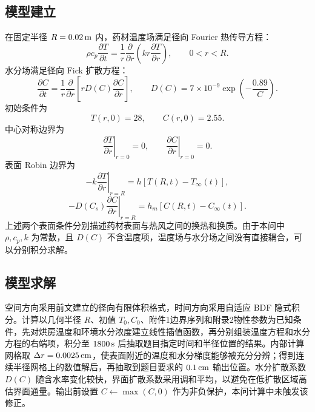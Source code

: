 \documentclass[UTF8,a4paper,12pt]{ctexart}
\numberwithin{equation}{section}
\begin{document}
\subsection{模型建立}
在固定半径 $R=0.02\rm\,m$ 内，药材温度场满足径向 Fourier 热传导方程：
\begin{equation}
  \rho c_p\frac{\partial T}{\partial t}
  =\frac1r\frac{\partial}{\partial r}
  \left(kr\frac{\partial T}{\partial r}\right),
  \qquad 0<r<R.
\end{equation}
水分场满足径向 Fick 扩散方程：
\begin{equation}
  \frac{\partial C}{\partial t}
  =\frac1r\frac{\partial}{\partial r}
  \left[rD(C)\frac{\partial C}{\partial r}\right],
  \qquad
  D(C)=7\times10^{-9}\exp\left(-\frac{0.89}{C}\right).
\end{equation}
初始条件为
\begin{equation}
  T(r,0)=28,\qquad C(r,0)=2.55.
\end{equation}
中心对称边界为
\begin{equation}
  \left.\frac{\partial T}{\partial r}\right|_{r=0}=0,\qquad
  \left.\frac{\partial C}{\partial r}\right|_{r=0}=0.
\end{equation}
表面 Robin 边界为
\begin{equation}
  -k\left.\frac{\partial T}{\partial r}\right|_{r=R}
  =h\left[T(R,t)-T_\infty(t)\right],
\end{equation}
\begin{equation}
  -D(C_s)\left.\frac{\partial C}{\partial r}\right|_{r=R}
  =h_m\left[C(R,t)-C_\infty(t)\right].
\end{equation}
上述两个表面条件分别描述药材表面与热风之间的换热和换质。由于本问中 $\rho,c_p,k$ 为常数，且 $D(C)$ 不含温度项，温度场与水分场之间没有直接耦合，可以分别积分求解。

\subsection{模型求解}
空间方向采用前文建立的径向有限体积格式，时间方向采用自适应 BDF 隐式积分。计算以几何半径 $R$、初值 $T_0,C_0$、附件1边界序列和附录2物性参数为已知条件，先对烘房温度和环境水分浓度建立线性插值函数，再分别组装温度方程和水分方程的右端项，积分至 $1800\rm\,s$ 后抽取题目指定时间和半径位置的结果。内部计算网格取 $\Delta r=0.0025\rm\,cm$，使表面附近的温度和水分梯度能够被充分分辨；得到连续半径网格上的数值解后，再抽取到题目要求的 $0.1\rm\,cm$ 输出位置。水分扩散系数 $D(C)$ 随含水率变化较快，界面扩散系数采用调和平均，以避免在低扩散区域高估界面通量。输出前设置 $C\leftarrow\max(C,0)$ 作为非负保护，本问计算中未触发该修正。
\end{document}
